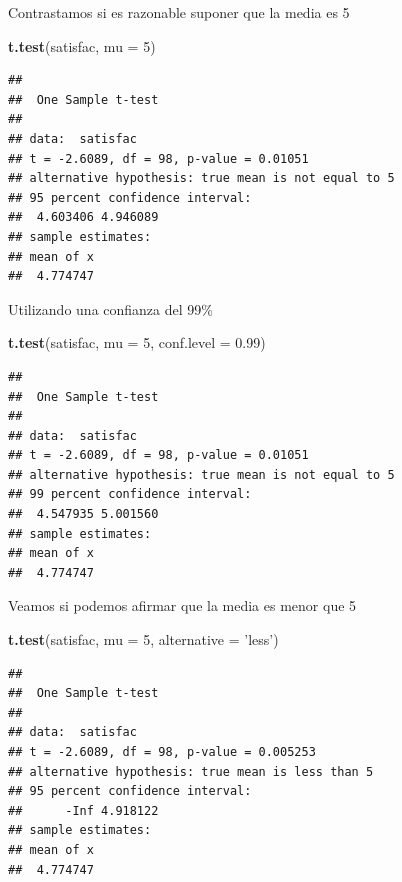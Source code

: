 \documentclass[]{book}
\newenvironment{Shaded}{\begin{snugshade}}{\end{snugshade}}
\newcommand{\KeywordTok}[1]{\textcolor[rgb]{0.13,0.29,0.53}{\textbf{#1}}}
\newcommand{\DataTypeTok}[1]{\textcolor[rgb]{0.13,0.29,0.53}{#1}}
\newcommand{\DecValTok}[1]{\textcolor[rgb]{0.00,0.00,0.81}{#1}}
\newcommand{\FloatTok}[1]{\textcolor[rgb]{0.00,0.00,0.81}{#1}}
\newcommand{\StringTok}[1]{\textcolor[rgb]{0.31,0.60,0.02}{#1}}
\newcommand{\NormalTok}[1]{#1}
\begin{document}
Contrastamos si es razonable suponer que la media es 5

\begin{Shaded}
\begin{Highlighting}[]
\KeywordTok{t.test}\NormalTok{(satisfac, }\DataTypeTok{mu =} \DecValTok{5}\NormalTok{)}
\end{Highlighting}
\end{Shaded}

\begin{verbatim}
## 
##  One Sample t-test
## 
## data:  satisfac
## t = -2.6089, df = 98, p-value = 0.01051
## alternative hypothesis: true mean is not equal to 5
## 95 percent confidence interval:
##  4.603406 4.946089
## sample estimates:
## mean of x 
##  4.774747
\end{verbatim}

Utilizando una confianza del 99\%

\begin{Shaded}
\begin{Highlighting}[]
\KeywordTok{t.test}\NormalTok{(satisfac, }\DataTypeTok{mu =} \DecValTok{5}\NormalTok{, }\DataTypeTok{conf.level =} \FloatTok{0.99}\NormalTok{)}
\end{Highlighting}
\end{Shaded}

\begin{verbatim}
## 
##  One Sample t-test
## 
## data:  satisfac
## t = -2.6089, df = 98, p-value = 0.01051
## alternative hypothesis: true mean is not equal to 5
## 99 percent confidence interval:
##  4.547935 5.001560
## sample estimates:
## mean of x 
##  4.774747
\end{verbatim}

Veamos si podemos afirmar que la media es menor que 5

\begin{Shaded}
\begin{Highlighting}[]
\KeywordTok{t.test}\NormalTok{(satisfac, }\DataTypeTok{mu =} \DecValTok{5}\NormalTok{, }\DataTypeTok{alternative =} \StringTok{'less'}\NormalTok{)}
\end{Highlighting}
\end{Shaded}

\begin{verbatim}
## 
##  One Sample t-test
## 
## data:  satisfac
## t = -2.6089, df = 98, p-value = 0.005253
## alternative hypothesis: true mean is less than 5
## 95 percent confidence interval:
##      -Inf 4.918122
## sample estimates:
## mean of x 
##  4.774747
\end{verbatim}
\end{document}
